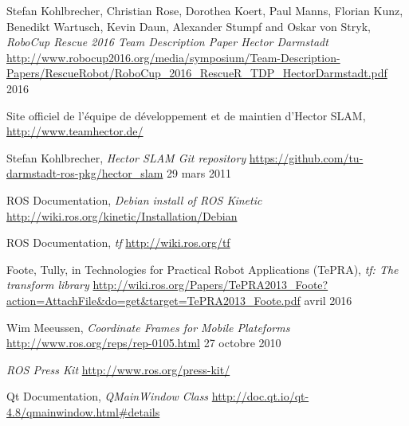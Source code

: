 \begin{thebibliography}{9}
  Stefan Kohlbrecher, Christian Rose, Dorothea Koert, Paul Manns, Florian Kunz, Benedikt Wartusch, Kevin Daun, Alexander Stumpf and Oskar von Stryk,
  \emph{RoboCup Rescue 2016 Team Description Paper Hector Darmstadt}
  \url{http://www.robocup2016.org/media/symposium/Team-Description-Papers/RescueRobot/RoboCup_2016_RescueR_TDP_HectorDarmstadt.pdf}
  2016
  
  Site officiel de l'équipe de développement et de maintien d'Hector SLAM,
  \url{http://www.teamhector.de/}
  
  Stefan Kohlbrecher,
  \emph{Hector SLAM Git repository}
  \url{https://github.com/tu-darmstadt-ros-pkg/hector_slam}
  29 mars 2011

  ROS Documentation,
  \emph{Debian install of ROS Kinetic}
  \url{http://wiki.ros.org/kinetic/Installation/Debian}
  
  ROS Documentation,
  \emph{tf}
  \url{http://wiki.ros.org/tf}

  Foote, Tully, in Technologies for Practical Robot Applications (TePRA), 
  \emph{tf: The transform library}
  \url{http://wiki.ros.org/Papers/TePRA2013_Foote?action=AttachFile&do=get&target=TePRA2013_Foote.pdf}
  avril 2016

  Wim Meeussen,
  \emph{Coordinate Frames for Mobile Plateforms}
  \url{http://www.ros.org/reps/rep-0105.html}
  27 octobre 2010 
  
  \emph{ROS Press Kit}
  \url{http://www.ros.org/press-kit/}

  Qt Documentation,
  \emph{QMainWindow Class}
  \url{http://doc.qt.io/qt-4.8/qmainwindow.html#details}
  
\end{thebibliography}
